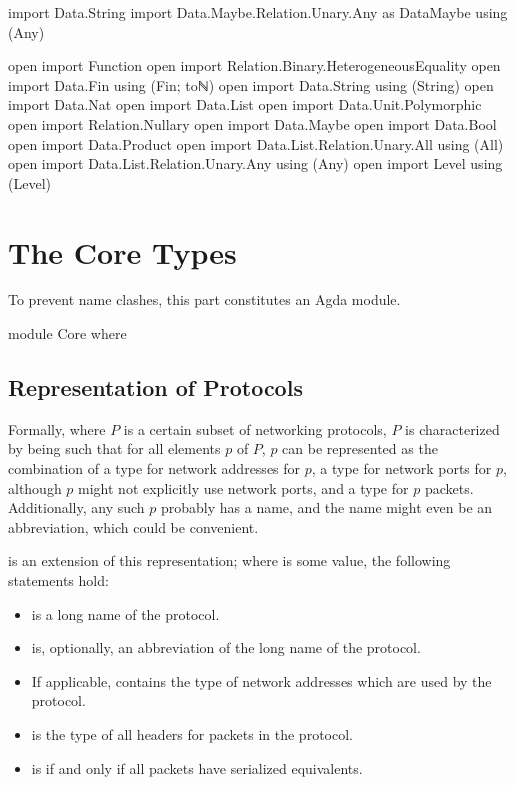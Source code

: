 \documentclass{report}
\begin{document}
\begin{code}
import Data.String
import Data.Maybe.Relation.Unary.Any as DataMaybe using (Any)

open import Function
open import Relation.Binary.HeterogeneousEquality
open import Data.Fin using (Fin; toℕ)
open import Data.String using (String)
open import Data.Nat
open import Data.List
open import Data.Unit.Polymorphic
open import Relation.Nullary
open import Data.Maybe
open import Data.Bool
open import Data.Product
open import Data.List.Relation.Unary.All using (All)
open import Data.List.Relation.Unary.Any using (Any)
open import Level using (Level)
\end{code}

\part{The Core Types}
To prevent name clashes, this part constitutes an Agda module.

\begin{code}
module Core where
\end{code}

\chapter{Representation of Protocols}
Formally, where \(P\) is a certain subset of networking protocols, \(P\) is characterized by being such that for all elements \(p\) of \(P\), \(p\) can be represented as the combination of a type for network addresses for \(p\), a type for network ports for \(p\), although \(p\) might not explicitly use network ports, and a type for \(p\) packets.  Additionally, any such \(p\) probably has a name, and the name might even be an abbreviation, which could be convenient.

 is an extension of this representation; where  is some   value, the following statements hold:
\begin{itemize}
	\item {}  is a long name of the  protocol.
	\item {}  is, optionally, an abbreviation of the long name of the  protocol.
	\item If applicable,   contains the type of network addresses which are used by the  protocol.
	\item {}  is the type of all headers for packets in the  protocol.
	\item {}  is  if and only if all  packets have serialized equivalents.
\end{itemize}
\end{document}
